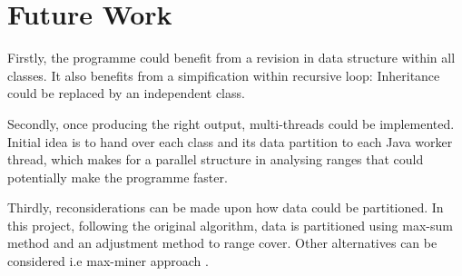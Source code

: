 \chapter{Future Work}	

Firstly, the programme could benefit from a revision in data structure within all classes. It also benefits from a simpification within recursive loop: Inheritance could be replaced by an independent class.

Secondly, once producing the right output, multi-threads could be implemented. Initial idea is to hand over each class and its data partition to each Java worker thread, which makes for a parallel structure in analysing ranges that could potentially make the programme faster.

Thirdly, reconsiderations can be made upon how data could be partitioned. In this project, following the original algorithm, data is partitioned using max-sum method and an adjustment method to range cover. Other alternatives can be considered i.e max-miner approach \cite{maxminer}.